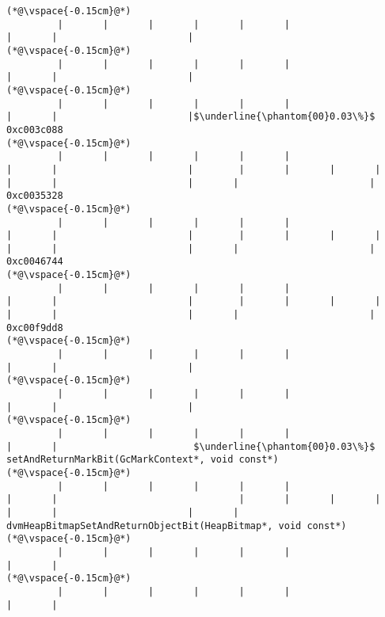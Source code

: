 \begin{lstlisting}[caption=NewDirectByteBuffer, label=profile:C2JNewDirectBuffer-512, numberbychapter=true, frame=lines, float, floatplacement=t]
(*@\vspace{-0.15cm}@*)
         |       |       |       |       |       |                       |       |                       |
(*@\vspace{-0.15cm}@*)
         |       |       |       |       |       |                       |       |                       |
(*@\vspace{-0.15cm}@*)
         |       |       |       |       |       |                       |       |                       |$\underline{\phantom{00}0.03\%}$ 0xc003c088
(*@\vspace{-0.15cm}@*)
         |       |       |       |       |       |                       |       |                       |        |       |       |       |       |       |                       |       |                       |       0xc0035328
(*@\vspace{-0.15cm}@*)
         |       |       |       |       |       |                       |       |                       |        |       |       |       |       |       |                       |       |                       |       0xc0046744
(*@\vspace{-0.15cm}@*)
         |       |       |       |       |       |                       |       |                       |        |       |       |       |       |       |                       |       |                       |       0xc00f9dd8
(*@\vspace{-0.15cm}@*)
         |       |       |       |       |       |                       |       |                       |
(*@\vspace{-0.15cm}@*)
         |       |       |       |       |       |                       |       |                       |
(*@\vspace{-0.15cm}@*)
         |       |       |       |       |       |                       |       |                        $\underline{\phantom{00}0.03\%}$ setAndReturnMarkBit(GcMarkContext*, void const*)
(*@\vspace{-0.15cm}@*)
         |       |       |       |       |       |                       |       |                                |       |       |       |       |       |                       |       |                               dvmHeapBitmapSetAndReturnObjectBit(HeapBitmap*, void const*)
(*@\vspace{-0.15cm}@*)
         |       |       |       |       |       |                       |       |
(*@\vspace{-0.15cm}@*)
         |       |       |       |       |       |                       |       |

\end{lstlisting}
